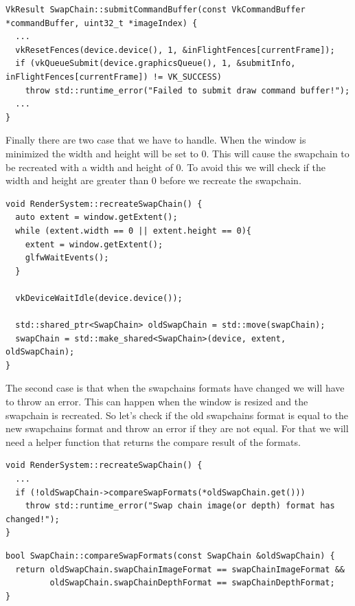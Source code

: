 \documentclass[12pt]{report} \usepackage{preamble}
\begin{document}
\begin{lstlisting}[Language=C++]
VkResult SwapChain::submitCommandBuffer(const VkCommandBuffer *commandBuffer, uint32_t *imageIndex) {
  ...
  vkResetFences(device.device(), 1, &inFlightFences[currentFrame]);
  if (vkQueueSubmit(device.graphicsQueue(), 1, &submitInfo, inFlightFences[currentFrame]) != VK_SUCCESS)
    throw std::runtime_error("Failed to submit draw command buffer!");
  ...
}
\end{lstlisting}

Finally there are two case that we have to handle. When the window is minimized the width and height will be set to 0. This will cause the swapchain to be recreated with a width and height of 0.
To avoid this we will check if the width and height are greater than 0 before we recreate the swapchain.

\begin{lstlisting}[Language=C++]
void RenderSystem::recreateSwapChain() {
  auto extent = window.getExtent();
  while (extent.width == 0 || extent.height == 0){
    extent = window.getExtent();
    glfwWaitEvents();
  }

  vkDeviceWaitIdle(device.device());

  std::shared_ptr<SwapChain> oldSwapChain = std::move(swapChain);
  swapChain = std::make_shared<SwapChain>(device, extent, oldSwapChain);
}
\end{lstlisting}

The second case is that when the swapchains formats have changed we will have to throw an error. This can happen when the window is resized and the swapchain is recreated.
So let's check if the old swapchains format is equal to the new swapchains format and throw an error if they are not equal. For that we will need a helper function that returns the
compare result of the formats.

\begin{lstlisting}[Language=C++]
void RenderSystem::recreateSwapChain() {
  ...
  if (!oldSwapChain->compareSwapFormats(*oldSwapChain.get()))
    throw std::runtime_error("Swap chain image(or depth) format has changed!");
}
\end{lstlisting}

\begin{lstlisting}[Language=C++]
bool SwapChain::compareSwapFormats(const SwapChain &oldSwapChain) {
  return oldSwapChain.swapChainImageFormat == swapChainImageFormat && 
         oldSwapChain.swapChainDepthFormat == swapChainDepthFormat;
}
\end{lstlisting}
\end{document}
